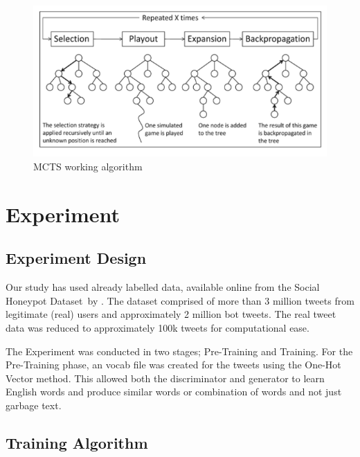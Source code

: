 \documentclass[conference]{IEEEtran}
\begin{document}
\begin{figure}
	\centering
	\includegraphics[width=\columnwidth]{images/figure_3.png}
	\caption{MCTS working algorithm}	
	\label{fig:MCTS}
\end{figure}



\section{Experiment}
\subsection{Experiment Design}
    Our study has used already labelled data, available online from the Social Honeypot Dataset\footnotemark \  by \citeauthor{Lee2011SevenMW} \cite{Lee2011SevenMW}. The dataset comprised of more than 3 million tweets from legitimate (real) users and approximately 2 million bot tweets. The real tweet data was reduced to approximately 100k tweets for computational ease.

    The Experiment was conducted in two stages; Pre-Training and Training. For the Pre-Training phase, an  vocab file was created for the tweets using the One-Hot Vector method. This allowed both the discriminator and generator to learn English words and produce similar words or combination of words and not just garbage text. 

\subsection{Training Algorithm}
\end{document}
